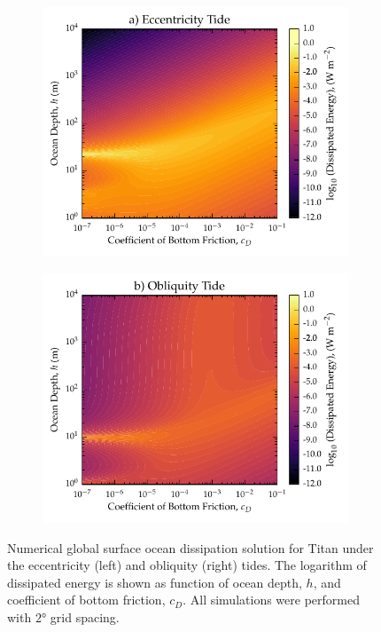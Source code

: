 \begin{figure}[!t]
\centering
\begin{subfigure}{0.48\linewidth}
\centering
\includegraphics[width=\linewidth]{Figures/Bottom_Ecc}
\subcaption{\label{fig:botEccTitan}}
\end{subfigure}%
\begin{subfigure}{0.48\linewidth}
\centering
\includegraphics[width=\linewidth]{Figures/Bottom_Obl}
\subcaption{\label{fig:botObliqTitan}}
\end{subfigure}
\vspace*{-0.8cm}
\caption{Numerical global surface ocean dissipation solution for Titan under the eccentricity (left) and obliquity (right) tides. The logarithm of dissipated energy is shown as function of ocean depth, $h$, and coefficient of bottom friction, $c_D$. All simulations were performed with $\ang{2}$ grid spacing. \label{fig:botTitan}}
\end{figure}

